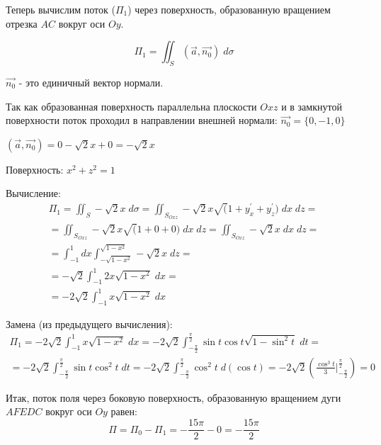 \begin{enumerate}
    Теперь вычислим поток ($\Pi_{1}$) через поверхность, образованную вращением отрезка $AC$ вокруг оси $Oy$.

    \begin{equation*}
        \Pi_{1} = \iint_{S} (\Vec{a}, \Vec{n_{0}})\; d\sigma
    \end{equation*}

    $\Vec{n_{0}}$ - это единичный вектор нормали. 
    
    Так как образованная поверхность  параллельна плоскости $Oxz$ и в замкнутой поверхности поток проходил в направлении внешней нормали: $\Vec{n_{0}} = \{0,-1,0\}$

    $(\Vec{a}, \Vec{n_{0}}) = 0 - \sqrt{2}x + 0 = -\sqrt{2}x$

    Поверхность: $x^2 + z^2 = 1$

    Вычисление:
    \begin{align*}
        \Pi_{1} = \iint_{S} -\sqrt{2}x\; d\sigma = \iint_{S_{Oxz}} -\sqrt{2}x \sqrt(1 + y_{x}^\prime + y_{z}^\prime)\; dx\;dz
        =\\=
        \iint_{S_{Oxz}} -\sqrt{2}x \sqrt(1 + 0 + 0)\; dx\;dz = \iint_{S_{Oxz}} -\sqrt{2}x \;dx\;dz 
        =\\=
        \int_{-1}^{1}dx\int_{-\sqrt{1-x^2}}^{\sqrt{1-x^2}} -\sqrt{2}x \;dz 
        =\\=
        -\sqrt{2}\int_{-1}^{1}2x\sqrt{1-x^2}\;dx
        =\\=
        -2\sqrt{2}\int_{-1}^{1}x\sqrt{1-x^2}\;dx
    \end{align*}

    Замена (из предыдущего вычисления):
    \begin{align*}
        \Pi_{1} = -2\sqrt{2}\int_{-1}^{1}x\sqrt{1-x^2}\;dx = -2\sqrt{2}\int_{-\frac{\pi}{2}}^{\frac{\pi}{2}}\sin{t}\cos{t}\sqrt{1-\sin^2{t}}\;dt 
        =\\=
        -2\sqrt{2}\int_{-\frac{\pi}{2}}^{\frac{\pi}{2}}\sin{t}\cos^2{t}\;dt
        = -2\sqrt{2}\int_{-\frac{\pi}{2}}^{\frac{\pi}{2}}\cos^2{t}\;d(\cos{t}) = -2\sqrt{2} \left(\frac{\cos^3{t}}{3}\biggr|_{-\frac{\pi}{2}}^{\frac{\pi}{2}} \right) = 0
    \end{align*}

    Итак, поток поля через боковую поверхность, образованную вращением дуги $AFEDC$ вокруг оси $Oy$ равен:
    \begin{equation*}
        \Pi = \Pi_{0} - \Pi_{1} = -\frac{15\pi}{2} - 0 = -\frac{15\pi}{2}
    \end{equation*}
\end{enumerate}

